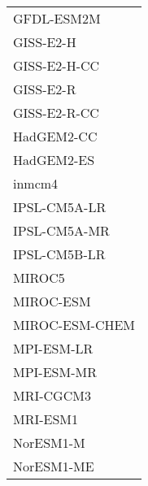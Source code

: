 \documentclass{ametsocV5}
\begin{document}
\begin{table}[t]
\begin{center}
\begin{tabular}{ l }
    GFDL-ESM2M      \\%
    GISS-E2-H       \\%
    GISS-E2-H-CC    \\%
    GISS-E2-R       \\%
    GISS-E2-R-CC    \\%
    HadGEM2-CC      \\%
    HadGEM2-ES      \\%
    inmcm4          \\%
    IPSL-CM5A-LR    \\%
    IPSL-CM5A-MR    \\%
    IPSL-CM5B-LR    \\%
    MIROC5          \\%
    MIROC-ESM       \\%
    MIROC-ESM-CHEM  \\%
    MPI-ESM-LR      \\%
    MPI-ESM-MR      \\%
    MRI-CGCM3       \\%
    MRI-ESM1        \\%
    NorESM1-M       \\%
    NorESM1-ME      \\%

  \end{tabular}
\end{center}
\end{table}
\end{document}

